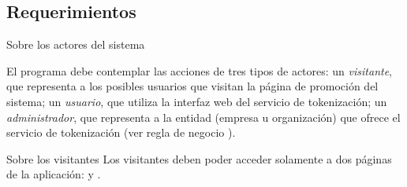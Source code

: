 %
%

\subsection{Requerimientos}

{Sobre los actores del sistema}
{
  El programa debe contemplar las acciones de tres tipos de actores: un
  \textit{visitante}, que representa a los posibles usuarios que visitan la
  página de promoción del sistema; un \textit{usuario}, que utiliza la interfaz
  web del servicio de tokenización; un \textit{administrador}, que representa a
  la entidad (empresa u organización) que ofrece el servicio de tokenización
  (ver regla de negocio ).

  {Sobre los visitantes}
  {
    Los visitantes deben poder acceder solamente a dos páginas de la aplicación:
     y .
  }
}

